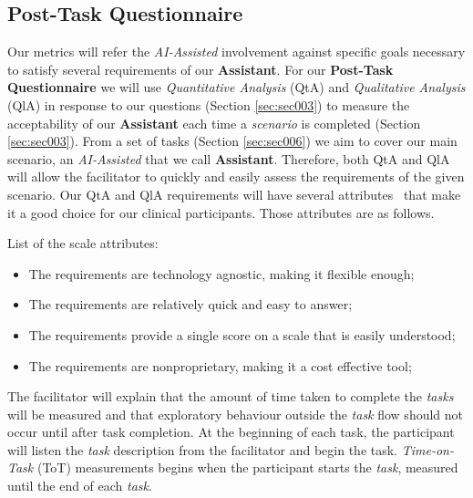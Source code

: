 \subsection{Post-Task Questionnaire}

Our metrics will refer the \textit{AI-Assisted} involvement against specific goals necessary to satisfy several requirements of our \textbf{Assistant}. For our \textbf{Post-Task Questionnaire} we will use \textit{Quantitative Analysis} (QtA) and \textit{Qualitative Analysis} (QlA) in response to our questions (Section \ref{sec:sec003}) to measure the acceptability of our \textbf{Assistant} each time a \textit{scenario} is completed (Section \ref{sec:sec003}). From a set of tasks (Section \ref{sec:sec006}) we aim to cover our main scenario, an \textit{AI-Assisted} that we call \textbf{Assistant}. Therefore, both QtA and QlA will allow the facilitator to quickly and easily assess the requirements of the given scenario. Our QtA and QlA requirements will have several attributes~\cite{joyce2017healthcare} that make it a good choice for our clinical participants. Those attributes are as follows.

\hfill


List of the scale attributes:


\hfill

\begin{itemize}
  \item The requirements are technology agnostic, making it flexible enough;
  \item The requirements are relatively quick and easy to answer;
  \item The requirements provide a single score on a scale that is easily understood;
  \item The requirements are nonproprietary, making it a cost effective tool;
\end{itemize}

\hfill


\clearpage

The facilitator will explain that the amount of time taken to complete the \textit{tasks} will be measured and that exploratory behaviour outside the \textit{task} flow should not occur until after task completion. At the beginning of each task, the participant will listen the \textit{task} description from the facilitator and begin the task. \textit{Time-on-Task} (ToT) measurements begins when the participant starts the \textit{task}, measured until the end of each \textit{task}.

